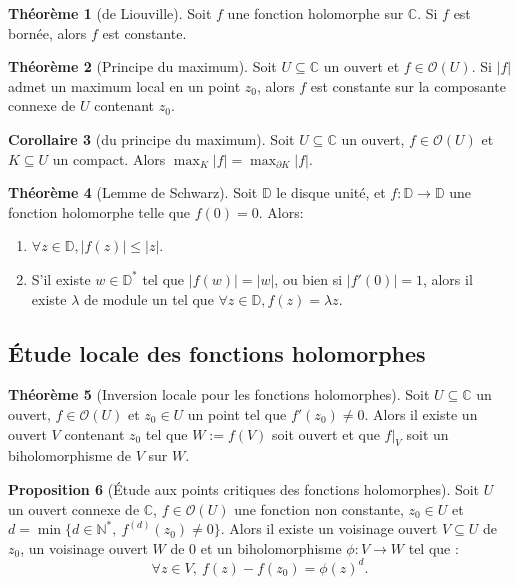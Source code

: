 \documentclass[11pt,a4paper]{article}
\newcommand{\N}{\mathbb{N}}
\newcommand{\D}{\mathbb{D}}
\newcommand{\C}{\mathbb{C}}
\theoremstyle{definition}
\newtheorem{theoreme}{Th\'eor\`eme}[section]
\newtheorem{prop}[theoreme]{Proposition}
\newtheorem{corollaire}[theoreme]{Corollaire}
\theoremstyle{plain}
\begin{document}
 \begin{theoreme}[de Liouville]
 Soit $f$ une fonction holomorphe sur $\C$.
 Si $f$ est bornée, alors $f$ est constante.
 \end{theoreme}
 

 
\begin{theoreme}[Principe du maximum]
Soit $U\subseteq \C$ un ouvert et $f \in \mathcal O(U)$.
Si $|f|$ admet un maximum local en un point $z_0$, alors $f$ est constante sur la composante connexe  de $U$ contenant $z_0$.
\end{theoreme}

\begin{corollaire}[du principe du maximum]
Soit $U\subseteq \C$ un ouvert,  $f \in \mathcal O(U)$ et $K\subseteq U$ un compact.
Alors $\max_{K} |f| = \max_{\partial K} |f|$.
\end{corollaire}

\begin{theoreme}[Lemme de Schwarz]
Soit $\D$ le disque unité, et $f :\D\to \D$ une fonction holomorphe telle que $f(0)=0$.
Alors:
\begin{enumerate}
\item $\forall z\in \D, |f(z)|\leq |z|$.
\item S'il existe $w \in \D^*$ tel que $|f(w)|= |w|$, ou bien si $|f'(0)|=1$, alors il existe $\lambda$ de module un tel que $\forall z\in \D, f(z)=\lambda z$.
\end{enumerate}
\end{theoreme}




\subsection{Étude locale des fonctions holomorphes}

\begin{theoreme}[Inversion locale pour les fonctions holomorphes]
Soit $U\subseteq \C$ un ouvert, $f\in \mathcal O(U)$ et $z_0\in U$ un point tel que $f'(z_0)\neq 0$.
Alors il existe un ouvert $V$ contenant $z_0$ tel que $W:=f(V)$ soit ouvert et que $f|_V$ soit un biholomorphisme de $V$ sur $W$.
\end{theoreme}

\begin{prop}[Étude aux points critiques des fonctions holomorphes]
Soit $U$ un ouvert connexe de $\C$, $f\in \mathcal O(U)$ une fonction non constante, $z_0\in U$ et $d = \min\{d\in \N^*,\: f^{(d)}(z_0)\neq 0\}$.
Alors il existe un voisinage ouvert $V\subseteq U$ de $z_0$, un voisinage ouvert  $W$ de $0$ et un biholomorphisme $\phi : V\to W$ tel que : 
\[ \forall z\in V, \: f(z) - f(z_0) = \phi(z)^d. \]
\end{prop}
\end{document}
